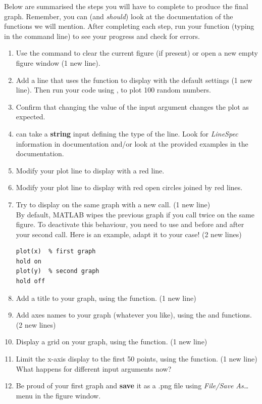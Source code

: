 \documentclass{article}
\begin{document}
Below are summarised the steps you will have to complete to produce the final graph. 
Remember, you can (and \emph{should}) look at the documentation of the functions we will mention.
After completing each step, run your function (typing  in the command line) to see your progress and check for errors.
\begin{enumerate}
  \item Use the  command to clear the current figure (if present) or open a new empty figure window (1 new line).
  \item Add a line that uses the  function to display  with the default settings (1 new line). Then run your code using
  , to plot 100 random numbers. 
  \item Confirm that changing the value of the input argument changes the plot as expected.
  \item {} can take a \textbf{string} input defining the type of the line.
    Look for \emph{LineSpec} information in  documentation and/or look at the provided examples in the documentation.
  \item Modify your plot line to display  with a red line.
  \item Modify your plot line to display  with red open circles joined by red lines.
  \item Try to display  on the same graph with a new  call. (1 new line)\\
    By default, MATLAB wipes the previous graph if you call  twice on the same figure.
    To deactivate this behaviour, you need to use  and  before and after
    your second  call.
    Here is an example, adapt it to your case! (2 new lines)
\begin{lstlisting}
plot(x)  % first graph
hold on
plot(y)  % second graph
hold off
\end{lstlisting}
  \item Add a title to your graph, using the  function. (1 new line)
  \item Add axes names to your graph (whatever you like), using the  and  functions. (2 new lines)
  \item Display a grid on your graph, using the  function. (1 new line)
  \item Limit the x-axis display to the first 50 points, using the  function. (1 new line) What happens for different
  input arguments now?
  \item Be proud of your first graph and \textbf{save} it as a .png file using \emph{File/Save As\dots} menu in the figure window.
\end{enumerate}
\end{document}
